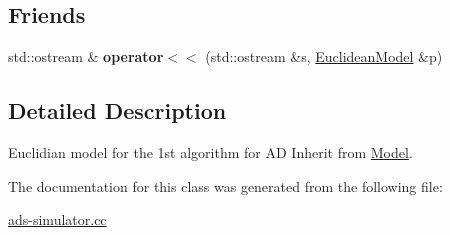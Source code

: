 \subsection*{Friends}
\begin{DoxyCompactItemize}
\item 
\hypertarget{classEuclideanModel_ac933d15ad4b493f033e627ac7c7b6157}{}std\+::ostream \& {\bfseries operator$<$$<$} (std\+::ostream \&s, \hyperlink{classEuclideanModel}{Euclidean\+Model} \&p)\label{classEuclideanModel_ac933d15ad4b493f033e627ac7c7b6157}

\end{DoxyCompactItemize}


\subsection{Detailed Description}
Euclidian model for the 1st algorithm for A\+D Inherit from \hyperlink{classModel}{Model}. 

The documentation for this class was generated from the following file\+:\begin{DoxyCompactItemize}
\item 
\hyperlink{ads-simulator_8cc}{ads-\/simulator.\+cc}\end{DoxyCompactItemize}
